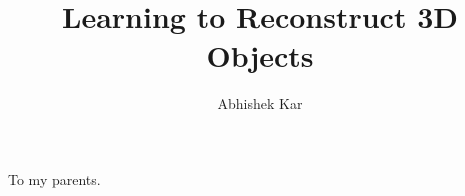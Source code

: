 \documentclass[12pt, oneside]{lib/ucthesis}
\begin{document}

\title{Learning to Reconstruct 3D Objects}
\author{Abhishek Kar}

\prevdegrees{} %


	


\begin{frontmatter} 
\maketitle
\approvalpage
\copyrightpage
\abstract
	
	\abstractsignature
\endabstract

\end{frontmatter}
\begin{optionalFrontMatter}
\begin{dedication}
	\vspace*{\fill} 
	To my parents.
	\vspace*{\fill} 
\end{dedication}
\end{optionalFrontMatter}
\end{document}

